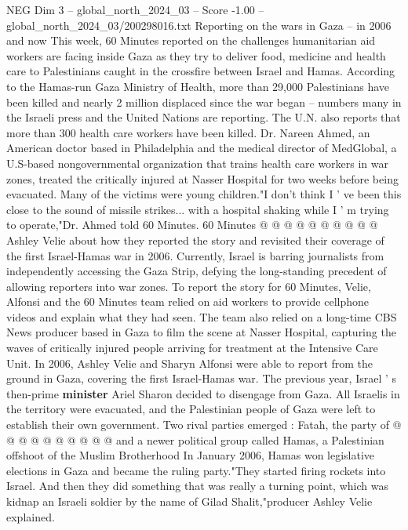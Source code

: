 \begin{textsample}{NEG Dim 3 – global\_north\_2024\_03 – Score -1.00 – global\_north\_2024\_03/200298016.txt}  \label{ex:f3_neg_189}
Reporting on the wars in Gaza -- in 2006 and now This week, 60 Minutes reported on the challenges humanitarian aid workers are facing inside Gaza as they try to deliver food, medicine and health care to Palestinians caught in the crossfire between Israel and Hamas.
According to the Hamas-run Gaza Ministry of Health, more than 29,000 Palestinians have been killed and nearly 2 million displaced since the war began -- numbers many in the Israeli press and the United Nations are reporting.
The U.N. also reports that more than 300 health care workers have been killed.
Dr.
Nareen Ahmed, an American doctor based in Philadelphia and the medical director of MedGlobal, a U.S-based nongovernmental organization that trains health care workers in war zones, treated the critically injured at Nasser Hospital for two weeks before being evacuated.
Many of the victims were young children."I don't think I ' ve been this close to the sound of missile strikes... with a hospital shaking while I ' m trying to operate,"Dr.
Ahmed told 60 Minutes. 60 Minutes @ @ @ @ @ @ @ @ @ @ Ashley Velie about how they reported the story and revisited their coverage of the first Israel-Hamas war in 2006.
Currently, Israel is barring journalists from independently accessing the Gaza Strip, defying the long-standing precedent of allowing reporters into war zones.
To report the story for 60 Minutes, Velie, Alfonsi and the 60 Minutes team relied on aid workers to provide cellphone videos and explain what they had seen.
The team also relied on a long-time CBS News producer based in Gaza to film the scene at Nasser Hospital, capturing the waves of critically injured people arriving for treatment at the Intensive Care Unit.
In 2006, Ashley Velie and Sharyn Alfonsi were able to report from the ground in Gaza, covering the first Israel-Hamas war.
The previous year, Israel ' s then-prime \textbf{minister} Ariel Sharon decided to disengage from Gaza.
All Israelis in the territory were evacuated, and the Palestinian people of Gaza were left to establish their own government.
Two rival parties emerged : Fatah, the party of @ @ @ @ @ @ @ @ @ @ and a newer political group called Hamas, a Palestinian offshoot of the Muslim Brotherhood In January 2006, Hamas won legislative elections in Gaza and became the ruling party."They started firing rockets into Israel.
And then they did something that was really a turning point, which was kidnap an Israeli soldier by the name of Gilad Shalit,"producer Ashley Velie explained.

\end{textsample}
